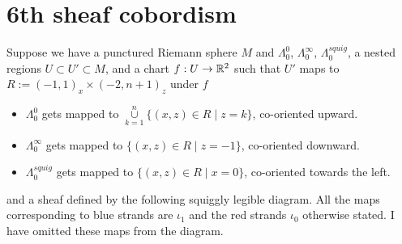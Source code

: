 \section{6th sheaf cobordism}
Suppose we have a punctured Riemann sphere $M$ and $\Lambda_0^0$, $\Lambda_0^\infty$, $\Lambda_0^{squig}$, a nested regions $U\subset U' \subset M$, and a chart $f : U \rightarrow \mathbb{R}^2$ such that $U'$ maps to $R:=(-1,1)_x \times (-2,n+1)_z$ under $f$
\begin{itemize}
\item $\Lambda_0^0$ gets mapped to $\overset{n}{\underset{k=1}{\cup}}\{(x,z)\in R \mid z=k\}$, co-oriented upward.

\item $\Lambda_0^\infty$ gets mapped to $\{(x,z)\in R \mid z=-1\}$, co-oriented downward.

\item $\Lambda_0^{squig}$ gets mapped to $\{(x,z)\in R \mid x=0\}$, co-oriented towards the left.
\end{itemize}
and a sheaf defined by the following squiggly legible diagram. All the maps corresponding to blue strands are $\iota_1$ and the red strands $\iota_0$ otherwise stated. I have omitted these maps from the diagram.\\

